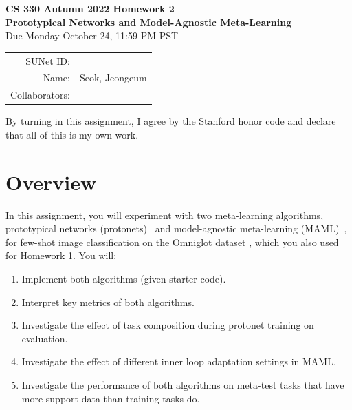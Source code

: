 \documentclass[12pt]{article}
\begin{document}
    \begin{center}
    {{\Large \textbf{CS 330 Autumn 2022 Homework 2 \\ Prototypical Networks and Model-Agnostic Meta-Learning}}
        \\ {\large Due Monday October 24, 11:59 PM PST}}

        \begin{tabular}{rl}
            SUNet ID:      &                \\
            Name:          & Seok, Jeongeum \\
            Collaborators: &
        \end{tabular}
    \end{center}

    By turning in this assignment, I agree by the Stanford honor code and declare that all of this is my own work.

    \section*{Overview}

    In this assignment, you will experiment with two meta-learning algorithms, prototypical networks (protonets)~\cite{prototypical} and model-agnostic meta-learning (MAML)~\cite{maml}, for few-shot image classification on the Omniglot dataset \cite{Lake1332}, which you also used for Homework 1. You will:
    \begin{enumerate}
        \item Implement both algorithms (given starter code).
        \item Interpret key metrics of both algorithms.
        \item Investigate the effect of task composition during protonet training on evaluation.
        \item Investigate the effect of different inner loop adaptation settings in MAML.
        \item Investigate the performance of both algorithms on meta-test tasks that have more support data than training tasks do.
    \end{enumerate}
\end{document}
